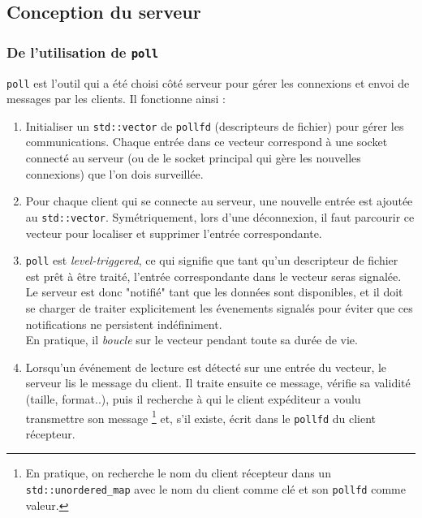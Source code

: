 \documentclass{article}
\begin{document}
\subsection{Conception du serveur}

\subsubsection{De l'utilisation de \texttt{poll}}
\noindent \texttt{poll} \cite{poll} est l'outil qui a été choisi côté serveur pour gérer les connexions et envoi de messages par les clients. Il fonctionne ainsi \cite{poll} :
\begin{enumerate}
    \item Initialiser un \texttt{std::vector} de \texttt{pollfd} (descripteurs de fichier) pour gérer les communications. Chaque entrée dans ce vecteur correspond à une socket connecté au serveur (ou  de le socket principal qui gère les nouvelles connexions) que l'on dois surveillée.
    \item Pour chaque client qui se connecte au serveur, une nouvelle entrée  est ajoutée au \texttt{std::vector}. Symétriquement, lors d'une déconnexion, il faut parcourir ce vecteur pour localiser et supprimer l'entrée correspondante.
    \item \texttt{poll} est \textit{level-triggered}, ce qui signifie que tant qu'un descripteur de fichier est prêt à être traité, l'entrée correspondante dans le vecteur seras signalée. Le serveur est donc "notifié" tant que les données sont disponibles, \cite{LevelEdgeTrigger} \cite{PollTrigger} et il doit se charger de traiter explicitement les évenements signalés pour éviter que ces notifications ne persistent indéfiniment.\\ En pratique, il \textit{boucle} sur le vecteur pendant toute sa durée de vie.
    \item Lorsqu’un événement de lecture est détecté sur une entrée du vecteur, le serveur lis le message du client. Il traite ensuite ce message, vérifie sa validité (taille, format..), puis il recherche à qui le client expéditeur a voulu transmettre son message \footnote{En pratique, on recherche le nom du client récepteur dans un \texttt{std::unordered\_map} avec le nom du client comme clé et son \texttt{pollfd} comme valeur.} et, s'il existe, écrit dans le \texttt{pollfd} du client récepteur.



\end{enumerate}
\end{document}
